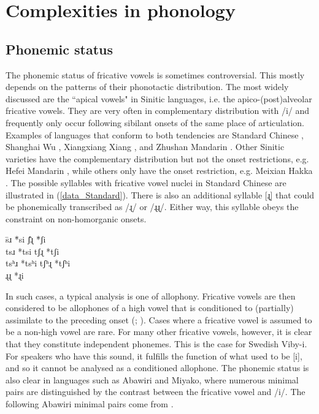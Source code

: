 \documentclass[output=paper,colorlinks,citecolor=brown,chinesefont]{langscibook}
\begin{document}
\section{Complexities in phonology}

\subsection{Phonemic status}
The phonemic status of fricative vowels is sometimes controversial. This mostly depends on the patterns of their phonotactic distribution. The most widely discussed are the ``apical vowels" in Sinitic languages, i.e. the apico-(post)alveolar fricative vowels. They are very often in complementary distribution with /i/ and frequently only occur following sibilant onsets of the same place of articulation. Examples of languages that conform to both tendencies are Standard Chinese \citep{Duanmu_2007}, Shanghai Wu \citep{Chen&Gussenhoven_2015}, Xiangxiang Xiang \citep{Zeng_2020}, and Zhushan Mandarin \citep{Chen&Guo_2022}. Other Sinitic varieties have the complementary distribution but not the onset restrictions, e.g. Hefei Mandarin \citep{Kong_et_al_2022}, while others only have the onset restriction, e.g. Meixian Hakka \citep{Lee&Zee_2009}. The possible syllables with fricative vowel nuclei in Standard Chinese are illustrated in (\ref{data_Standard}). There is also an additional syllable [ɻ̩] that could be phonemically transcribed as /ɻ/ or /ɻɻ/. Either way, this syllable obeys the constraint on non-homorganic onsets.

\ea \label{data_Standard}
    \begin{tabbing}
    \quad \= sɹ \qquad \= *si \qquad \qquad \qquad\= ʃɻ \qquad \= *ʃi\\
    \> tsɹ \> *tsi \> tʃɻ \> *tʃi\\
    \> tsʰɹ \> *tsʰi \>tʃʰɻ \> *tʃʰi\\
    \>\>\> ɻɻ \>  *ɻi
    \end{tabbing}
\z

In such cases, a typical analysis is one of allophony. Fricative vowels are then considered to be allophones of a high vowel that is conditioned to (partially) assimilate to the preceding onset (\cite{Cheng_1973}; \cite{Lee_and_Zee_2007}). Cases where a fricative vowel is assumed to be a non-high vowel are rare. For many other fricative vowels, however, it is clear that they constitute independent phonemes. This is the case for Swedish Viby-i. For speakers who have this sound, it fulfills the function of what used to be [i], and so it cannot be analysed as a conditioned allophone. The phonemic status is also clear in languages such as Abawiri and Miyako, where numerous minimal pairs are distinguished by the contrast between the fricative vowel and /i/. The following Abawiri minimal pairs come from \citet[53--54]{Yoder_2020}.
\end{document}
